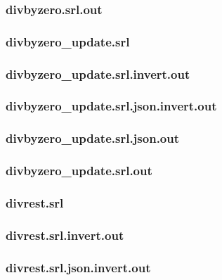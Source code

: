 \subsubsection{divbyzero.srl.out}
\label{app:divbyzero_srl.out}

\subsubsection{divbyzero\_update.srl}
\label{app:divbyzero_update_srl}

\subsubsection{divbyzero\_update.srl.invert.out}
\label{app:divbyzero_update_srl.invert.out}

\subsubsection{divbyzero\_update.srl.json.invert.out}
\label{app:divbyzero_update_srl.json.invert.out}

\subsubsection{divbyzero\_update.srl.json.out}
\label{app:divbyzero_update_srl.json.out}

\subsubsection{divbyzero\_update.srl.out}
\label{app:divbyzero_update_srl.out}

\subsubsection{divrest.srl}
\label{app:divrest_srl}

\subsubsection{divrest.srl.invert.out}
\label{app:divrest_srl.invert.out}

\subsubsection{divrest.srl.json.invert.out}
\label{app:divrest_srl.json.invert.out}

